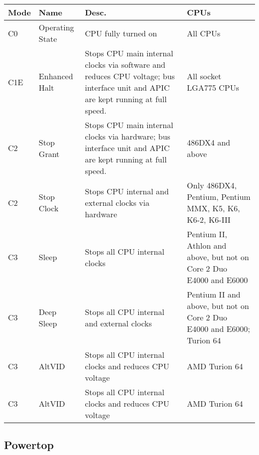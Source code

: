 \documentclass{article}
\begin{document}
{\centering

\label{c-states}
\begin{tabular}{llll}
\hline
\multicolumn{1}{|l|}{Mode} & \multicolumn{1}{|l|}{Name} & \multicolumn{1}{|l|}{Desc.} & \multicolumn{1}{|l|}{CPUs} \\
\hline
\multicolumn{1}{|l|}{C0} & \multicolumn{1}{|l|}{Operating State} & \multicolumn{1}{|l|}{CPU fully turned on} & \multicolumn{1}{|l|}{All CPUs} \\
\hline
\multicolumn{1}{|l|}{C1E} & \multicolumn{1}{|l|}{Enhanced Halt} & \multicolumn{1}{|l|}{\parbox{5cm}{Stops CPU main internal clocks via software and reduces CPU voltage; bus interface unit and APIC are kept running at full speed.}} & \multicolumn{1}{|l|}{All socket LGA775 CPUs} \\
\hline
\multicolumn{1}{|l|}{C2} & \multicolumn{1}{|l|}{Stop Grant} & \multicolumn{1}{|l|}{\parbox{5cm}{Stops CPU main internal clocks via hardware; bus interface unit and APIC are kept running at full speed.}} & \multicolumn{1}{|l|}{486DX4 and above} \\
\hline
\multicolumn{1}{|l|}{C2} & \multicolumn{1}{|l|}{Stop Clock} & \multicolumn{1}{|l|}{\parbox{5cm}{Stops CPU internal and external clocks via hardware}} & \multicolumn{1}{|l|}{\parbox{5cm}{Only 486DX4, Pentium, Pentium MMX, K5, K6, K6-2, K6-III}} \\
\hline
\multicolumn{1}{|l|}{C3} & \multicolumn{1}{|l|}{Sleep} & \multicolumn{1}{|l|}{\parbox{5cm}{Stops all CPU internal clocks}} & \multicolumn{1}{|l|}{\parbox{5cm}{Pentium II, Athlon and above, but not on Core 2 Duo E4000 and E6000}} \\
\hline
\multicolumn{1}{|l|}{C3} & \multicolumn{1}{|l|}{Deep Sleep} & \multicolumn{1}{|l|}{\parbox{5cm}{Stops all CPU internal and external clocks}} & \multicolumn{1}{|l|}{\parbox{5cm}{Pentium II and above, but not on Core 2 Duo E4000 and E6000; Turion 64}} \\
\hline
\multicolumn{1}{|l|}{C3} & \multicolumn{1}{|l|}{AltVID} & \multicolumn{1}{|l|}{\parbox{5cm}{Stops all CPU internal clocks and reduces CPU voltage}} & \multicolumn{1}{|l|}{AMD Turion 64} \\
\hline
\multicolumn{1}{|l|}{C3} & \multicolumn{1}{|l|}{AltVID} & \multicolumn{1}{|l|}{\parbox{5cm}{Stops all CPU internal clocks and reduces CPU voltage}} & \multicolumn{1}{|l|}{AMD Turion 64} \\
\hline
\end{tabular}
}

\subsection{Powertop}
\end{document}
